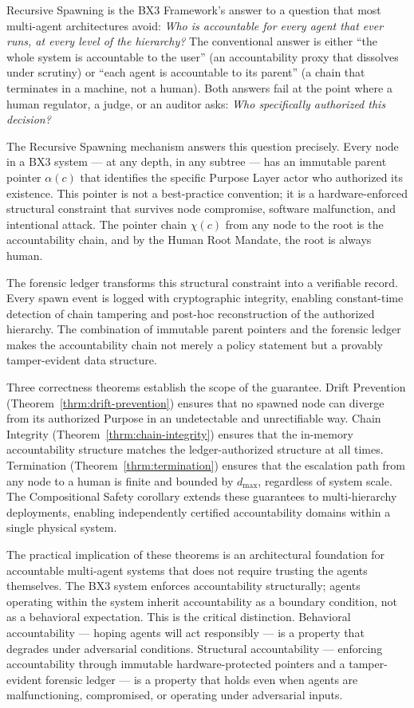 Recursive Spawning is the BX3 Framework's answer to a question that most multi-agent architectures avoid: \textit{Who is accountable for every agent that ever runs, at every level of the hierarchy?} The conventional answer is either ``the whole system is accountable to the user'' (an accountability proxy that dissolves under scrutiny) or ``each agent is accountable to its parent'' (a chain that terminates in a machine, not a human). Both answers fail at the point where a human regulator, a judge, or an auditor asks: \textit{Who specifically authorized this decision?}

The Recursive Spawning mechanism answers this question precisely. Every node in a BX3 system — at any depth, in any subtree — has an immutable parent pointer $\alpha(c)$ that identifies the specific Purpose Layer actor who authorized its existence. This pointer is not a best-practice convention; it is a hardware-enforced structural constraint that survives node compromise, software malfunction, and intentional attack. The pointer chain $\chi(c)$ from any node to the root is the accountability chain, and by the Human Root Mandate, the root is always human.

The forensic ledger transforms this structural constraint into a verifiable record. Every spawn event is logged with cryptographic integrity, enabling constant-time detection of chain tampering and post-hoc reconstruction of the authorized hierarchy. The combination of immutable parent pointers and the forensic ledger makes the accountability chain not merely a policy statement but a provably tamper-evident data structure.

Three correctness theorems establish the scope of the guarantee. Drift Prevention (Theorem~\ref{thrm:drift-prevention}) ensures that no spawned node can diverge from its authorized Purpose in an undetectable and unrectifiable way. Chain Integrity (Theorem~\ref{thrm:chain-integrity}) ensures that the in-memory accountability structure matches the ledger-authorized structure at all times. Termination (Theorem~\ref{thrm:termination}) ensures that the escalation path from any node to a human is finite and bounded by $d_{\max}$, regardless of system scale. The Compositional Safety corollary extends these guarantees to multi-hierarchy deployments, enabling independently certified accountability domains within a single physical system.

The practical implication of these theorems is an architectural foundation for accountable multi-agent systems that does not require trusting the agents themselves. The BX3 system enforces accountability structurally; agents operating within the system inherit accountability as a boundary condition, not as a behavioral expectation. This is the critical distinction. Behavioral accountability — hoping agents will act responsibly — is a property that degrades under adversarial conditions. Structural accountability — enforcing accountability through immutable hardware-protected pointers and a tamper-evident forensic ledger — is a property that holds even when agents are malfunctioning, compromised, or operating under adversarial inputs.


